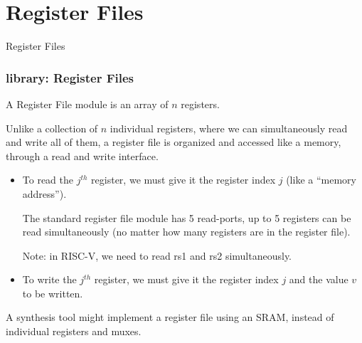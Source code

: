 
\section{Register Files}


\begin{frame}

\begin{center}
  {\LARGE Register Files}
\end{center}

\end{frame}


\begin{frame}[fragile]
\frametitle{{\BSV} library: Register Files}

\footnotesize

A Register File module is an array of $n$ registers.

\vspace{4ex}

Unlike a collection of $n$ individual registers, where we can
simultaneously read and write all of them, a register file is
organized and accessed like a memory, through a read and write
interface.

\vspace{2ex}

\begin{itemize}

 \item To read the $j^{th}$ register, we must give it the register
       index $j$ (like a ``memory address'').

       The standard {\BSV} register file module has 5 read-ports,
       {\ie} up to 5 registers can be read simultaneously (no matter
       how many registers are in the register file).

       Note: in RISC-V, we need to read rs1 and rs2 simultaneously.

 \PAUSE{\vspace{2ex}}

 \item To write the $j^{th}$ register, we must give it the register
       index $j$ and the value $v$ to be written.

\end{itemize}

\PAUSE{\vspace{2ex}}

A synthesis tool might implement a register file using an SRAM,
instead of individual registers and muxes.

\end{frame}

